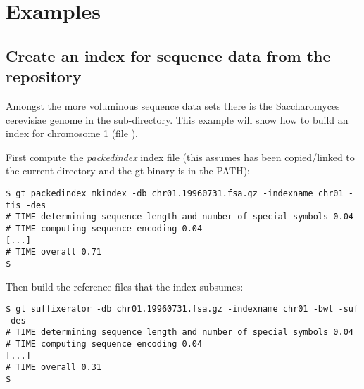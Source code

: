 \documentclass[12pt,titlepage]{article}
\newcommand{\packedindex}{\textit{packedindex}\xspace}
\newcommand{\species}[1]{{\fontshape{it}\selectfont #1}}%
\begin{document}
\begin{Justshowoptions}





\end{Justshowoptions}

\section{Examples}
\label{sec:packedindex:examples}

\subsection{Create an index for sequence data from the
   repository\cite{gttestdata}}
\label{sec:packedindex:examples:yeast}

Amongst the more voluminous sequence data sets there is the
\species{Saccharomyces cerevisiae} genome in the
 sub-directory. This example will show how
to build an index for chromosome 1 (file
).

First compute the \packedindex index file (this assumes
 has been copied/linked to the current
directory and the gt binary is in the PATH):
\begin{footnotesize}
\begin{verbatim}
$ gt packedindex mkindex -db chr01.19960731.fsa.gz -indexname chr01 -tis -des
# TIME determining sequence length and number of special symbols 0.04
# TIME computing sequence encoding 0.04
[...]
# TIME overall 0.71
$
\end{verbatim}
\end{footnotesize}

Then build the reference files that the index subsumes:
\begin{footnotesize}
\begin{verbatim}
$ gt suffixerator -db chr01.19960731.fsa.gz -indexname chr01 -bwt -suf -des
# TIME determining sequence length and number of special symbols 0.04
# TIME computing sequence encoding 0.04
[...]
# TIME overall 0.31
$
\end{verbatim}
\end{footnotesize}
\end{document}
